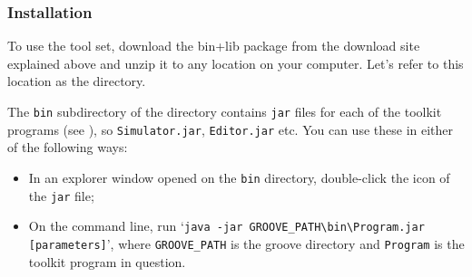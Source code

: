 \subsubsection{Installation}

To use the \GROOVE tool set, download the bin+lib package from the download
site explained above and unzip it to any location on your computer. Let's refer
to this location as the \GROOVE directory.

The \texttt{bin} subdirectory of the \GROOVE directory contains \texttt{jar}
files for each of the toolkit programs (see ), so
\texttt{Simulator.jar}, \texttt{Editor.jar} etc. You can use these in either of
the following ways:
\begin{itemize}
\item In an explorer window opened on the \texttt{bin} directory, double-click
  the icon of the \texttt{jar} file;
\item On the command line, run %
  `\verb|java -jar GROOVE_PATH\bin\Program.jar [parameters]|', %
  where \texttt{GROOVE\_PATH} is the groove directory and \texttt{Program} is
  the toolkit program in question.
\end{itemize}
